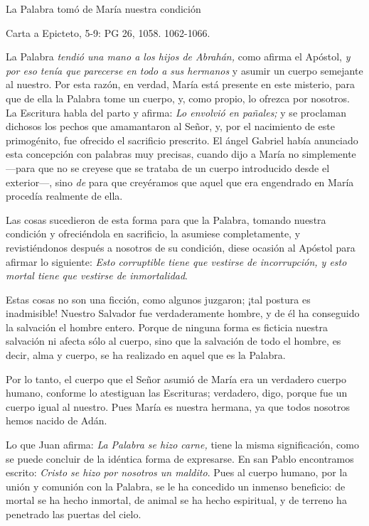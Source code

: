 \begin{body}
\begin{body}
La Palabra tomó de María nuestra condición

Carta a Epicteto, 5-9: PG 26, 1058. 1062-1066.

La Palabra \emph{tendió una mano a los hijos de Abrahán,} como afirma el Apóstol, \emph{y por eso tenía que parecerse en todo a sus hermanos} y asumir un cuerpo semejante al nuestro. Por esta razón, en verdad, María está presente en este misterio, para que de ella la Palabra tome un cuerpo, y, como propio, lo ofrezca por nosotros. La Escritura habla del parto y afirma: \emph{Lo envolvió en pañales;} y se proclaman dichosos los pechos que amamantaron al Señor, y, por el nacimiento de este primogénito, fue ofrecido el sacrificio prescrito. El ángel Gabriel había anunciado esta concepción con palabras muy precisas, cuando dijo a María no simplemente  ---para que no se creyese que se trataba de un cuerpo introducido desde el exterior---, sino \emph{de} para que creyéramos que aquel que era engendrado en María procedía realmente de ella.

Las cosas sucedieron de esta forma para que la Palabra, tomando nuestra condición y ofreciéndola en sacrificio, la asumiese completamente, y revistiéndonos después a nosotros de su condición, diese ocasión al Apóstol para afirmar lo siguiente: \emph{Esto corruptible tiene que vestirse de incorrupción, y esto mortal tiene que vestirse de inmortalidad}.

Estas cosas no son una ficción, como algunos juzgaron; ¡tal postura es inadmisible! Nuestro Salvador fue verdaderamente hombre, y de él ha conseguido la salvación el hombre entero. Porque de ninguna forma es ficticia nuestra salvación ni afecta sólo al cuerpo, sino que la salvación de todo el hombre, es decir, alma y cuerpo, se ha realizado en aquel que es la Palabra.

Por lo tanto, el cuerpo que el Señor asumió de María era un verdadero cuerpo humano, conforme lo atestiguan las Escrituras; verdadero, digo, porque fue un cuerpo igual al nuestro. Pues María es nuestra hermana, ya que todos nosotros hemos nacido de Adán.

Lo que Juan afirma: \emph{La Palabra se hizo carne,} tiene la misma significación, como se puede concluir de la idéntica forma de expresarse. En san Pablo encontramos escrito: \emph{Cristo se hizo por nosotros un maldito}. Pues al cuerpo humano, por la unión y comunión con la Palabra, se le ha concedido un inmenso beneficio: de mortal se ha hecho inmortal, de animal se ha hecho espiritual, y de terreno ha penetrado las puertas del cielo.


\end{body}
\end{body}
